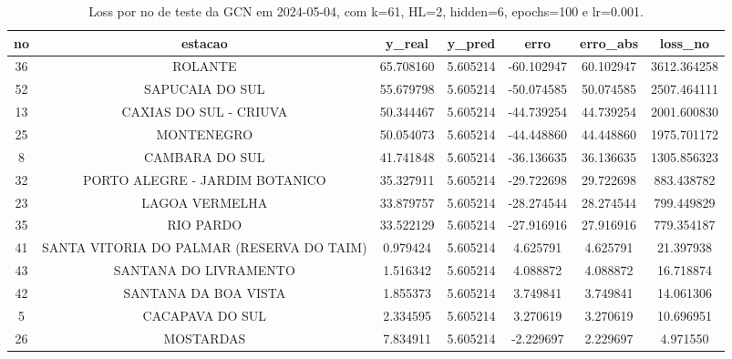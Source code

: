 \begin{table}[h]
\centering
\caption{Loss por no de teste da GCN em 2024-05-04, com k=61, HL=2, hidden=6, epochs=100 e lr=0.001.}
\label{tab:gcn_loss_k61_hl2_h6_e100_d20240504}
\begin{tabular}{ccccccc}
\toprule
no & estacao & y\_real & y\_pred & erro & erro\_abs & loss\_no \\
\midrule
36 & ROLANTE & 65.708160 & 5.605214 & -60.102947 & 60.102947 & 3612.364258 \\
52 & SAPUCAIA DO SUL & 55.679798 & 5.605214 & -50.074585 & 50.074585 & 2507.464111 \\
13 & CAXIAS DO SUL - CRIUVA & 50.344467 & 5.605214 & -44.739254 & 44.739254 & 2001.600830 \\
25 & MONTENEGRO & 50.054073 & 5.605214 & -44.448860 & 44.448860 & 1975.701172 \\
8 & CAMBARA DO SUL & 41.741848 & 5.605214 & -36.136635 & 36.136635 & 1305.856323 \\
32 & PORTO ALEGRE - JARDIM BOTANICO & 35.327911 & 5.605214 & -29.722698 & 29.722698 & 883.438782 \\
23 & LAGOA VERMELHA & 33.879757 & 5.605214 & -28.274544 & 28.274544 & 799.449829 \\
35 & RIO PARDO & 33.522129 & 5.605214 & -27.916916 & 27.916916 & 779.354187 \\
41 & SANTA VITORIA DO PALMAR (RESERVA DO TAIM) & 0.979424 & 5.605214 & 4.625791 & 4.625791 & 21.397938 \\
43 & SANTANA DO LIVRAMENTO & 1.516342 & 5.605214 & 4.088872 & 4.088872 & 16.718874 \\
42 & SANTANA DA BOA VISTA & 1.855373 & 5.605214 & 3.749841 & 3.749841 & 14.061306 \\
5 & CACAPAVA DO SUL & 2.334595 & 5.605214 & 3.270619 & 3.270619 & 10.696951 \\
26 & MOSTARDAS & 7.834911 & 5.605214 & -2.229697 & 2.229697 & 4.971550 \\
\bottomrule
\end{tabular}
\end{table}
